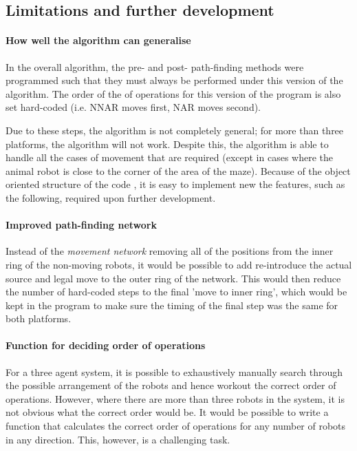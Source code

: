 \subsection{Limitations and further development}

\paragraph{How well the algorithm can generalise} In the overall algorithm, the pre- and post- path-finding methods were programmed such that they must always be performed under this version of the algorithm. The order of the of operations for this version of the program is also set hard-coded (i.e. NNAR moves first, NAR moves second). %

Due to these steps, the algorithm is not completely general; for more than three platforms, the algorithm will not work. Despite this, the algorithm is able to handle all the cases of movement that are required (except in cases where the animal robot is close to the corner of the area of the maze).
Because of the object oriented structure of the code \cite{SOLID_book}, it is easy to implement new the features, such as the following, required upon further development. 

\paragraph{Improved path-finding network} Instead of the\textit{ movement network} removing all of the positions from the inner ring of the non-moving robots, it would be possible to add re-introduce the actual source and legal move to the outer ring of the network. This would then reduce the number of hard-coded steps to the final 'move to inner ring', which would be kept in the program to make sure the timing of the final step was the same for both platforms.
\paragraph{Function for deciding order of operations}

For a three agent system, it is possible to exhaustively manually search through the possible arrangement of the robots and hence workout the correct order of operations. However, where there are more than three robots in the system, it is not obvious what the correct order would be. It would be possible to write a function that calculates the correct order of operations for any number of robots in any direction. This, however, is a challenging task.

